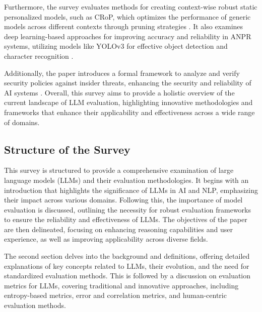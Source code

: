 Furthermore, the survey evaluates methods for creating context-wise robust static personalized models, such as CRoP, which optimizes the performance of generic models across different contexts through pruning strategies \cite{kaur2024cropcontextwiserobuststatic}. It also examines deep learning-based approaches for improving accuracy and reliability in ANPR systems, utilizing models like YOLOv3 for effective object detection and character recognition \cite{adak2022automaticnumberplaterecognition}.



Additionally, the paper introduces a formal framework to analyze and verify security policies against insider threats, enhancing the security and reliability of AI systems \cite{kammller2020applyingisabelleinsiderframework}. Overall, this survey aims to provide a holistic overview of the current landscape of LLM evaluation, highlighting innovative methodologies and frameworks that enhance their applicability and effectiveness across a wide range of domains.



\subsection{Structure of the Survey} \label{subsec:Structure of the Survey}



This survey is structured to provide a comprehensive examination of large language models (LLMs) and their evaluation methodologies. It begins with an introduction that highlights the significance of LLMs in AI and NLP, emphasizing their impact across various domains. Following this, the importance of model evaluation is discussed, outlining the necessity for robust evaluation frameworks to ensure the reliability and effectiveness of LLMs. The objectives of the paper are then delineated, focusing on enhancing reasoning capabilities and user experience, as well as improving applicability across diverse fields.



The second section delves into the background and definitions, offering detailed explanations of key concepts related to LLMs, their evolution, and the need for standardized evaluation methods. This is followed by a discussion on evaluation metrics for LLMs, covering traditional and innovative approaches, including entropy-based metrics, error and correlation metrics, and human-centric evaluation methods.



